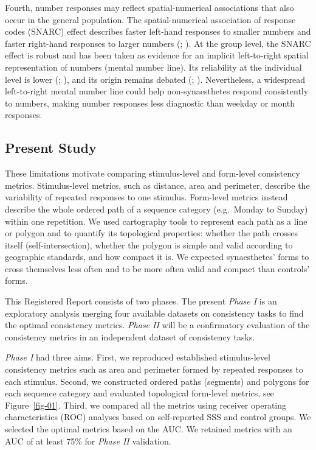 \documentclass[
  man,
  floatsintext,
  longtable,
  nolmodern,
  notxfonts,
  notimes,
  colorlinks=true,linkcolor=blue,citecolor=blue,urlcolor=blue]{apa7}
\begin{document}
Fourth, number responses may reflect spatial-numerical associations that
also occur in the general population. The spatial-numerical association
of response codes (SNARC) effect describes faster left-hand responses to
smaller numbers and faster right-hand responses to larger numbers
(;
). At the group level,
the SNARC effect is robust and has been taken as evidence for an
implicit left-to-right spatial representation of numbers (mental number
line). Its reliability at the individual level is lower
(;
), and its origin remains
debated (;
). Nevertheless, a
widespread left-to-right mental number line could help non-synaesthetes
respond consistently to numbers, making number responses less diagnostic
than weekday or month responses.

\subsection{Present Study}\label{sec-present-study}

These limitations motivate comparing stimulus-level and form-level
consistency metrics. Stimulus-level metrics, such as distance, area and
perimeter, describe the variability of repeated responses to one
stimulus. Form-level metrics instead describe the whole ordered path of
a sequence category (e.g.~Monday to Sunday) within one repetition. We
used cartography tools to represent each path as a line or polygon and
to quantify its topological properties: whether the path crosses itself
(self-intersection), whether the polygon is simple and valid according
to geographic standards, and how compact it is. We expected
synaesthetes' forms to cross themselves less often and to be more often
valid and compact than controls' forms.

This Registered Report consists of two phases. The present \emph{Phase
I} is an exploratory analysis merging four available datasets on
consistency tasks to find the optimal consistency metrics. \emph{Phase
II} will be a confirmatory evaluation of the consistency metrics in an
independent dataset of consistency tasks.

\emph{Phase I} had three aims. First, we reproduced established
stimulus-level consistency metrics such as area and perimeter formed by
repeated responses to each stimulus. Second, we constructed ordered
paths (segments) and polygons for each sequence category and evaluated
topological form-level metrics, see Figure~\ref{fig-01}. Third, we
compared all the metrics using receiver operating characteristics (ROC)
analyses based on self-reported SSS and control groups. We selected the
optimal metrics based on the AUC. We retained metrics with an AUC of at
least 75\% for \emph{Phase II} validation.
\end{document}
